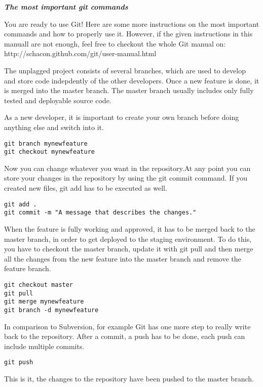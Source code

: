 \textbf{\textit{The most important git commands}}

You are ready to use Git! Here are some more instructions on the most important commands and how to properly use it. However, if the given instructions in this manuall are not enough, feel free to checkout the whole Git manual on: http://schacon.github.com/git/user-manual.html

The unplagged project consists of several branches, which are used to develop and store code indepdently of the other developers. Once a new feature is done, it is merged into the master branch. The master branch usually includes only fully tested and deployable source code. 

As a new developer, it is important to create your own branch before doing anything else and switch into it.
\begin{verbatim}
git branch mynewfeature
git checkout mynewfeature
\end{verbatim}

Now you can change whatever you want in the repository.At any point you can store your changes in the repository by using the git commit command. If you created new files, git add has to be executed as well.

\begin{verbatim}
git add .
git commit -m "A message that describes the changes."
\end{verbatim}

When the feature is fully working and approved, it has to be merged back to the master branch, in order to get deployed to the staging environment. To do this, you have to checkout the master branch, update it with git pull and then merge all the changes from the new feature into the master branch and remove the feature branch.
\begin{verbatim}
git checkout master
git pull
git merge mynewfeature
git branch -d mynewfeature
\end{verbatim}

In comparison to Subversion, for example Git has one more step to really write back to the repository. After a commit, a push has to be done, each push can include multiple commits.
\begin{verbatim}
git push
\end{verbatim}

This is it, the changes to the repository have been pushed to the master branch.

